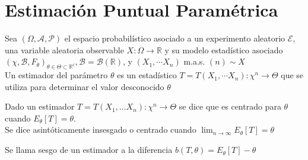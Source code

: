 \section{Estimación Puntual Paramétrica}

\begin{definición}[Estimador]
Sea $(\Omega, \mathcal{A}, \mathcal{P})$ el espacio probabilístico asociado a un experimento aleatorio $\mathcal{E}$, una variable aleatoria observable $X: \Omega \longrightarrow \mathbb{R}$ y su modelo estadístico asociado $\left(\chi, \mathcal{B}, F_{\theta}\right)_{\theta \in \Theta \subset \mathbb{R}^{\ell}}, \mathcal{B}=\mathcal{B}(\mathbb{R})$, y $\left(X_{1}, \cdots X_{n}\right)$ m.a.s. $(n) \sim X$
\\Un estimador del parámetro $\theta$ es un estadístico $T=T\left(X_{1}, \cdots X_{n}\right): \chi^{n} \longrightarrow \Theta$ que se utiliza para determinar el valor desconocido $\theta$
\end{definición}

\begin{definición}
Dado un estimador $T = T(X_1, \ldots X_n): \chi^{n} \to \Theta$ se dice que es centrado para $\theta$ cuando $E_{\theta}[T] = \theta$. \\
Se dice asintóticamente insesgado o centrado cuando $\lim_{n \to \infty}E_{\theta}[T] = \theta$
\end{definición}

\begin{definición}[Sesgo]
Se llama sesgo de un estimador a la diferencia $b(T, \theta) = E_{\theta}[T] - \theta$
\end{definición}


